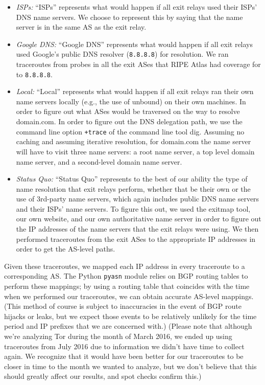 \begin{itemize}
    \item \emph{ISPs:} ``ISPs'' represents what would happen if all exit relays used their ISPs' DNS name 
servers.  We choose to represent this by saying that the name server is in the same AS as the 
exit relay.

    \item \emph{Google DNS:} ``Google DNS'' represents what would happen if all exit relays used 
Google's public DNS resolver ({\tt 8.8.8.8}) for resolution. We ran traceroutes from probes in all the exit 
ASes that RIPE Atlas had coverage for to  {\tt 8.8.8.8}.

    \item \emph{Local:} ``Local'' represents what would happen if all exit relays ran their own name 
servers locally (e.g., the use of unbound) on their own machines. In order to figure out 
what ASes would be traversed on the way to resolve domain.com. In order to figure out the 
DNS delegation path, we use the command line option \texttt{+trace} of the
command line tool dig. Assuming no caching and assuming 
iterative resolution, for domain.com the name server will have to visit three name servers:
a root name server, a top level domain name server, and a second-level domain name server. 

    \item \emph{Status Quo:} ``Status Quo'' represents to the best of our ability the 
type of name resolution 
that exit relays perform, whether that be their own or the use of 3rd-party name servers, 
which again includes public DNS name servers and their ISPs' name servers.  To figure this 
out, we used the exitmap tool, our own website, and our own authoritative name server 
in order to figure out the IP addresses of the name servers that the exit relays were 
using. We then performed traceroutes from the exit ASes to the appropriate IP addresses 
in order to get the AS-level paths.
\end{itemize}


Given these traceroutes, we mapped each IP address in every traceroute
to a corresponding AS.  The Python {\tt pyasn} module relies on BGP
routing tables to perform these mappings; by using a routing table that
coincides with the time when we performed our traceroutes, we can obtain
accurate AS-level mappings.  (This method of course is subject to
inaccuracies in the event of BGP route hijacks or leaks, but we expect
those events to be relatively unlikely for the time period and IP
prefixes that we are concerned with.)  (Please note that although we're 
analyzing Tor during the month of March 2016, we ended up using traceroutes from 
July 2016 due to information we didn't have time to collect again.  We recognize 
that it would have been better for our traceroutes to be closer in time to the 
month we wanted to analyze, but we don't 
believe that this should greatly affect our results, and spot checks confirm 
this.)  



